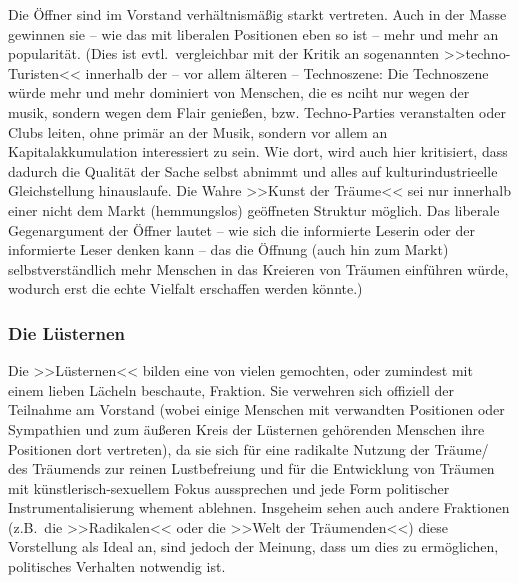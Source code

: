 \documentclass[12pt, a4paper, openany]{report}
\begin{document}
Die Öffner sind im Vorstand verhältnismäßig starkt vertreten. 
Auch in der Masse gewinnen sie -- wie das mit liberalen Positionen eben so ist -- mehr und mehr an popularität.
(Dies ist evtl.~vergleichbar mit der Kritik an sogenannten >>techno-Turisten<< innerhalb der -- vor allem älteren -- Technoszene: 
Die Technoszene würde mehr und mehr dominiert von Menschen, die es nciht nur wegen der musik, sondern wegen dem Flair genießen, bzw. Techno-Parties veranstalten oder Clubs leiten, ohne primär an der Musik, sondern vor allem an Kapitalakkumulation interessiert zu sein. 
Wie dort, wird auch hier kritisiert, dass dadurch die Qualität der Sache selbst abnimmt und alles auf kulturindustrieelle Gleichstellung hinauslaufe. 
Die Wahre >>Kunst der Träume<< sei nur innerhalb einer nicht dem Markt (hemmungslos) geöffneten Struktur möglich.
Das liberale Gegenargument der Öffner lautet -- wie sich die informierte Leserin oder der informierte Leser denken kann -- das die Öffnung (auch hin zum Markt) selbstverständlich mehr Menschen in das Kreieren von Träumen einführen würde, wodurch erst die echte Vielfalt erschaffen werden könnte.)

\subsubsection{Die Lüsternen}
Die >>Lüsternen<< bilden eine von vielen gemochten, oder zumindest mit einem lieben Lächeln beschaute, Fraktion.
Sie verwehren sich offiziell der Teilnahme am Vorstand (wobei einige Menschen mit verwandten Positionen oder Sympathien und zum äußeren Kreis der Lüsternen gehörenden Menschen ihre Positionen dort vertreten), da sie sich für eine radikalte Nutzung der Träume/ des Träumends zur reinen Lustbefreiung und für die Entwicklung von Träumen mit künstlerisch-sexuellem Fokus aussprechen und jede Form politischer Instrumentalisierung whement ablehnen.
Insgeheim sehen auch andere Fraktionen (z.B.~die >>Radikalen<< oder die >>Welt der Träumenden<<) diese Vorstellung als Ideal an, sind jedoch der Meinung, dass um dies zu ermöglichen, politisches Verhalten notwendig ist.
\end{document}
